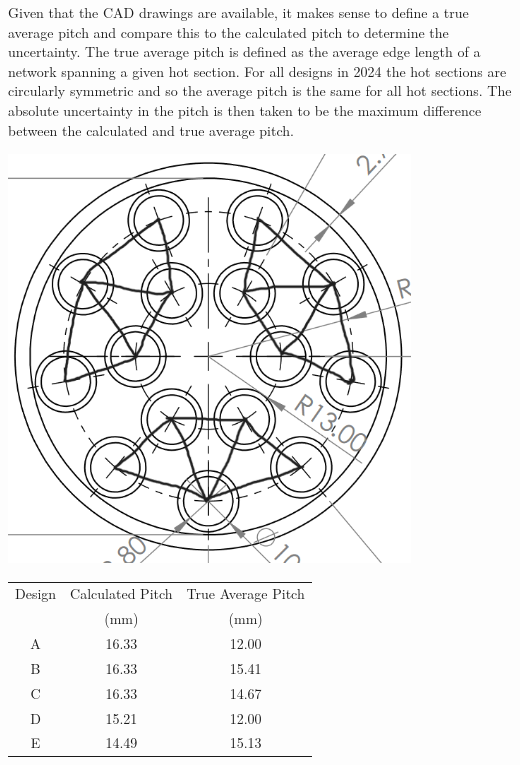 \documentclass{article}
\begin{document}
Given that the CAD drawings are available, it makes sense to define a true average pitch and compare this to the calculated pitch to determine the uncertainty.
The true average pitch is defined as the average edge length of a network spanning a given hot section.
For all designs in 2024 the hot sections are circularly symmetric and so the average pitch is the same for all hot sections.
The absolute uncertainty in the pitch is then taken to be the maximum difference between the calculated and true average pitch.

\begin{minipage}[t]{0.29\textwidth}
    \centering
    \includegraphics[width=0.8\textwidth]{tube_network.png}
    \label{fig:tube_network}
\end{minipage}
\begin{minipage}[t]{0.69\textwidth}
    \centering
    \begin{tabular}{c|c|c}
        Design & Calculated Pitch & True Average Pitch \\
        & (mm) & (mm) \\
        \hline
        A & 16.33 & 12.00 \\
        B & 16.33 & 15.41 \\
        C & 16.33 & 14.67 \\
        D & 15.21 & 12.00 \\
        E & 14.49 & 15.13 \\
    \end{tabular}
    \label{tab:pitch_comparison}
\end{minipage}
\end{document}
